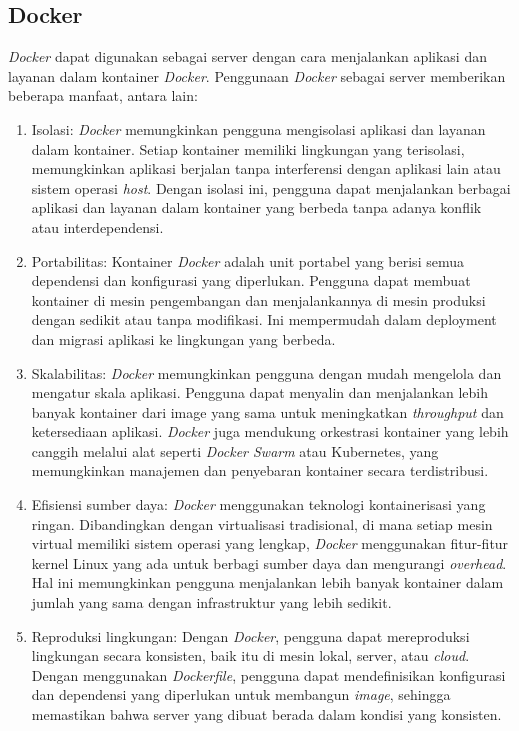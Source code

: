 \subsection{Docker}
\emph{Docker} dapat digunakan sebagai server dengan cara menjalankan aplikasi dan layanan dalam kontainer \emph{Docker}. Penggunaan \emph{Docker} sebagai server memberikan beberapa manfaat, antara lain:
\begin{enumerate}
\item Isolasi: \emph{Docker} memungkinkan pengguna mengisolasi aplikasi dan layanan dalam kontainer. Setiap kontainer memiliki lingkungan yang terisolasi, memungkinkan aplikasi berjalan tanpa interferensi dengan aplikasi lain atau sistem operasi \emph{host}. Dengan isolasi ini, pengguna dapat menjalankan berbagai aplikasi dan layanan dalam kontainer yang berbeda tanpa adanya konflik atau interdependensi.
\item Portabilitas: Kontainer \emph{Docker} adalah unit portabel yang berisi semua dependensi dan konfigurasi yang diperlukan. Pengguna dapat membuat kontainer di mesin pengembangan dan menjalankannya di mesin produksi dengan sedikit atau tanpa modifikasi. Ini mempermudah dalam deployment dan migrasi aplikasi ke lingkungan yang berbeda.
\item Skalabilitas: \emph{Docker} memungkinkan pengguna dengan mudah mengelola dan mengatur skala aplikasi. Pengguna dapat menyalin dan menjalankan lebih banyak kontainer dari image yang sama untuk meningkatkan \emph{throughput} dan ketersediaan aplikasi. \emph{Docker} juga mendukung orkestrasi kontainer yang lebih canggih melalui alat seperti \emph{Docker Swarm} atau Kubernetes, yang memungkinkan manajemen dan penyebaran kontainer secara terdistribusi.
\item Efisiensi sumber daya: \emph{Docker} menggunakan teknologi kontainerisasi yang ringan. Dibandingkan dengan virtualisasi tradisional, di mana setiap mesin virtual memiliki sistem operasi yang lengkap, \emph{Docker} menggunakan fitur-fitur kernel Linux yang ada untuk berbagi sumber daya dan mengurangi \emph{overhead}. Hal ini memungkinkan pengguna menjalankan lebih banyak kontainer dalam jumlah yang sama dengan infrastruktur yang lebih sedikit.
\item Reproduksi lingkungan: Dengan \emph{Docker}, pengguna dapat mereproduksi lingkungan secara konsisten, baik itu di mesin lokal, server, atau \emph{cloud}. Dengan menggunakan \emph{Dockerfile}, pengguna dapat mendefinisikan konfigurasi dan dependensi yang diperlukan untuk membangun \emph{image}, sehingga memastikan bahwa server yang dibuat berada dalam kondisi yang konsisten.\cite{sten}
\end{enumerate} 


